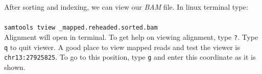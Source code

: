 After sorting and indexing, we can view our \textit{BAM} file. In linux terminal type:\\~\\
\texttt{samtools tview \mapReads\_mapped.reheaded.sorted.bam }\\

Alignment will open in terminal. To get help on viewing alignment, type \texttt{?}.
Type \texttt{q} to quit viewer. A good place to view mapped reads and
test the viewer is \texttt{chr13:27925825}. To go to this position, type \texttt{g}
and enter this coordinate as it is shown.

